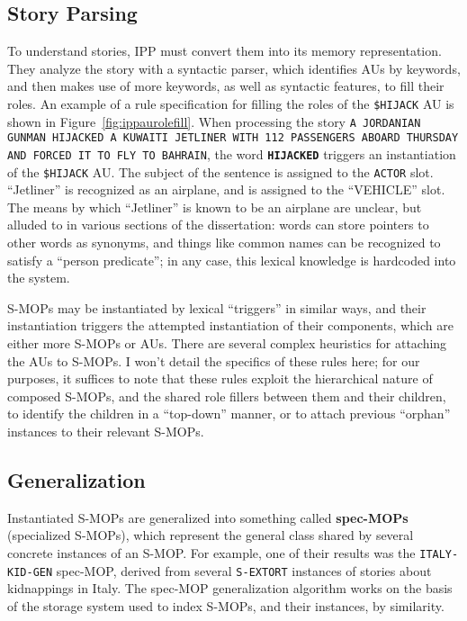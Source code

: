 \subsection{Story Parsing}
To understand stories, IPP must convert them into its memory representation. They analyze the story with a syntactic parser, which identifies AUs by keywords, and then makes use of more keywords, as well as syntactic features, to fill their roles. An example of a rule specification for filling the roles of the \texttt{\$HIJACK} AU is shown in Figure~\ref{fig:ippaurolefill}. When processing the story \texttt{A JORDANIAN GUNMAN HIJACKED A KUWAITI JETLINER WITH
112 PASSENGERS ABOARD THURSDAY AND FORCED IT TO FLY TO
BAHRAIN}, the word \texttt{\textbf{HIJACKED}} triggers an instantiation of the \texttt{\$HIJACK} AU. The subject of the sentence is assigned to the \texttt{ACTOR} slot. ``Jetliner'' is recognized as an airplane, and is assigned to the ``VEHICLE'' slot. The means by which ``Jetliner'' is known to be an airplane are unclear, but alluded to in various sections of the dissertation: words can store pointers to other words as synonyms, and things like common names can be recognized to satisfy a ``person predicate''; in any case, this lexical knowledge is hardcoded into the system.

S-MOPs may be instantiated by lexical ``triggers'' in similar ways, and their instantiation triggers the attempted instantiation of their components, which are either more S-MOPs or AUs. There are several complex heuristics for attaching the AUs to S-MOPs. I won't detail the specifics of these rules here; for our purposes, it suffices to note that these rules exploit the hierarchical nature of composed S-MOPs, and the shared role fillers between them and their children, to identify the children in a ``top-down'' manner, or to attach previous ``orphan'' instances to their relevant S-MOPs.

\subsection{Generalization}
Instantiated S-MOPs are generalized into something called \textbf{spec-MOPs} (specialized S-MOPs), which represent the general class shared by several concrete instances of an S-MOP. For example, one of their results was the \texttt{ITALY-KID-GEN} spec-MOP, derived from several \texttt{S-EXTORT} instances of stories about kidnappings in Italy. The spec-MOP generalization algorithm works on the basis of the storage system used to index S-MOPs, and their instances, by similarity.

